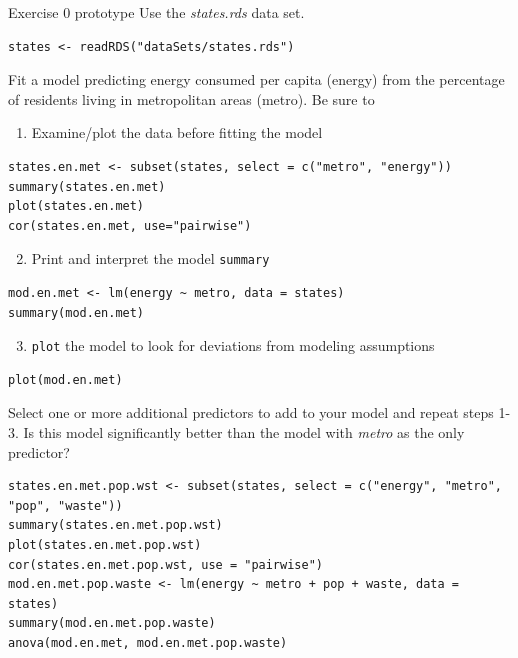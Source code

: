 \documentclass[table,smaller]{beamer}
\begin{document}
\begin{frame}[fragile,label=sec-6-1]{Exercise 0 prototype}
 Use the \emph{states.rds} data set. 
\begin{verbatim}
states <- readRDS("dataSets/states.rds")
\end{verbatim}

Fit a model predicting  energy consumed per capita (energy) from the percentage of residents living in metropolitan areas (metro). Be sure to 
\begin{enumerate}
\setcounter{enumi}{0}
\item Examine/plot the data before fitting the model
\end{enumerate}
\begin{verbatim}
states.en.met <- subset(states, select = c("metro", "energy"))
summary(states.en.met)
plot(states.en.met)
cor(states.en.met, use="pairwise")
\end{verbatim}

\begin{enumerate}
\setcounter{enumi}{1}
\item Print and interpret the model \texttt{summary}
\end{enumerate}
\begin{verbatim}
mod.en.met <- lm(energy ~ metro, data = states)
summary(mod.en.met)
\end{verbatim}

\begin{enumerate}
\setcounter{enumi}{2}
\item \texttt{plot} the model to look for deviations from modeling assumptions
\end{enumerate}
\begin{verbatim}
plot(mod.en.met)
\end{verbatim}

Select one or more additional predictors to add to your model and repeat steps 1-3. Is this model significantly better than the model with \emph{metro} as the only predictor?
\begin{verbatim}
states.en.met.pop.wst <- subset(states, select = c("energy", "metro", "pop", "waste"))
summary(states.en.met.pop.wst)
plot(states.en.met.pop.wst)
cor(states.en.met.pop.wst, use = "pairwise")
mod.en.met.pop.waste <- lm(energy ~ metro + pop + waste, data = states)
summary(mod.en.met.pop.waste)
anova(mod.en.met, mod.en.met.pop.waste)
\end{verbatim}
\end{frame}
\end{document}
